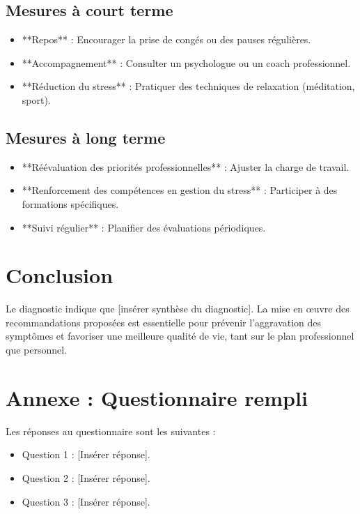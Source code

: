 \documentclass[12pt,a4paper]{report}
\begin{document}
\section{Mesures à court terme}
\begin{itemize}
    \item **Repos** : Encourager la prise de congés ou des pauses régulières.
    \item **Accompagnement** : Consulter un psychologue ou un coach professionnel.
    \item **Réduction du stress** : Pratiquer des techniques de relaxation (méditation, sport).
\end{itemize}

\section{Mesures à long terme}
\begin{itemize}
    \item **Réévaluation des priorités professionnelles** : Ajuster la charge de travail.
    \item **Renforcement des compétences en gestion du stress** : Participer à des formations spécifiques.
    \item **Suivi régulier** : Planifier des évaluations périodiques.
\end{itemize}

\chapter*{Conclusion}
Le diagnostic indique que [insérer synthèse du diagnostic]. La mise en œuvre des recommandations proposées est essentielle pour prévenir l'aggravation des symptômes et favoriser une meilleure qualité de vie, tant sur le plan professionnel que personnel.

\appendix
\chapter{Annexe : Questionnaire rempli}
\label{annex:questionnaire}

Les réponses au questionnaire sont les suivantes :
\begin{itemize}
    \item Question 1 : [Insérer réponse].
    \item Question 2 : [Insérer réponse].
    \item Question 3 : [Insérer réponse].
\end{itemize}
\end{document}
